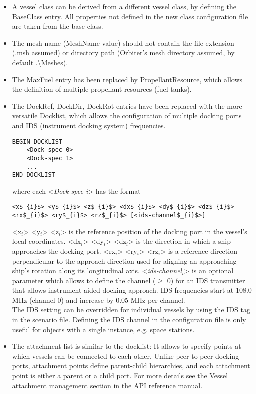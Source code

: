 \documentclass[Orbiter Developer Manual.tex]{subfiles}
\begin{document}
\begin{itemize}
\item A vessel class can be derived from a different vessel class, by defining the BaseClass entry. All properties not defined in the new class configuration file are taken from the base class.
\item The mesh name (MeshName value) should not contain the file extension (.msh assumed) or directory path (Orbiter’s mesh directory assumed, by default .\textbackslash Meshes).
\item The MaxFuel entry has been replaced by PropellantResource, which allows the definition of multiple propellant resources (fuel tanks).
\item The DockRef, DockDir, DockRot entries have been replaced with the more versatile Docklist, which allows the configuration of multiple docking ports and IDS (instrument docking system) frequencies.

\begin{lstlisting}[language=OSFS]
BEGIN_DOCKLIST
	<Dock-spec 0>
	<Dock-spec 1>
	...
END_DOCKLIST
\end{lstlisting}

\noindent
where each <\textit{Dock-spec i}> has the format

\begin{lstlisting}[language=OSFS,mathescape=true]
<x$_{i}$> <y$_{i}$> <z$_{i}$> <dx$_{i}$> <dy$_{i}$> <dz$_{i}$> <rx$_{i}$> <ry$_{i}$> <rz$_{i}$> [<ids-channel$_{i}$>]
\end{lstlisting}

\noindent
<x$_{i}$> <y$_{i}$> <z$_{i}$> is the reference position of the docking port in the vessel’s local coordinates. <dx$_{i}$> <dy$_{i}$> <dz$_{i}$> is the direction in which a ship approaches the docking port. <rx$_{i}$> <ry$_{i}$> <rz$_{i}$> is a reference direction perpendicular to the approach direction used for aligning an approaching ship’s rotation along its longitudinal axis. <\textit{ids-channel}$_{i}$> is an optional parameter which allows to define the channel ($\geq$ 0) for an IDS transmitter that allows instrument-aided docking approach. IDS frequencies start at 108.0 MHz (channel 0) and increase by 0.05 MHz per channel.\\
The IDS setting can be overridden for individual vessels by using the IDS tag in the scenario file. Defining the IDS channel in the configuration file is only useful for objects with a single instance, e.g. space stations.

\item The attachment list is similar to the docklist: It allows to specify points at which vessels can be connected to each other. Unlike peer-to-peer docking ports, attachment points define parent-child hierarchies, and each attachment point is either a parent or a child port. For more details see the Vessel attachment management section in the API reference manual.


\end{itemize}
\end{document}
